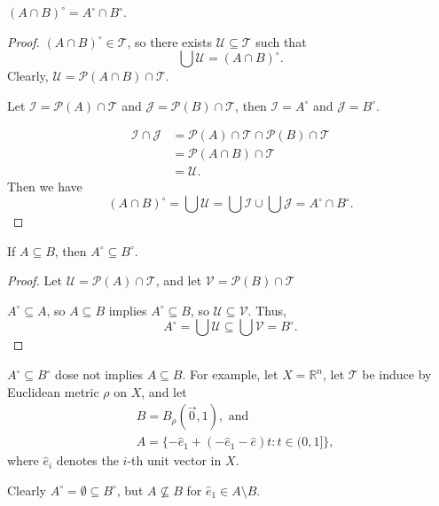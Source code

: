 \begin{proposition}
	$(A \cap B)^\circ = A^\circ \cap B^\circ$.
	
	\begin{proof}
		$(A \cap B)^\circ \in \mathcal T$, so there exists $\mathcal U \subseteq \mathcal T$ such that 
		$$
		\bigcup \mathcal U = (A \cap B)^\circ.
		$$
		Clearly, $\mathcal U = \mathcal P(A \cap B) \cap \mathcal T$.
		
		Let $\mathcal I = \mathcal P(A) \cap \mathcal T$ and $\mathcal J = \mathcal P(B) \cap \mathcal T$, then $\mathcal I = A^\circ$ and $\mathcal J = B^\circ$. 
		
		$$
		\begin{aligned}
			\mathcal I \cap \mathcal J &= \mathcal P(A) \cap \mathcal T \cap \mathcal P(B) \cap \mathcal T \\
			&= \mathcal P(A \cap B) \cap \mathcal T \\
			&= \mathcal U.
		\end{aligned}
		$$
		Then we have
		$$
		(A \cap B)^\circ = \bigcup \mathcal U = \bigcup \mathcal I \cup \bigcup \mathcal J = A^\circ \cap B^\circ.
		$$
	\end{proof}
\end{proposition}


\begin{proposition}
	If $A \subseteq B$, then $A^\circ \subseteq B^\circ$.
	
	\begin{proof}
		Let $\mathcal U = \mathcal P(A) \cap \mathcal T$, and let $\mathcal V = \mathcal P(B) \cap \mathcal T$
	
		$A^\circ \subseteq A$, so $A \subseteq B$ implies $A^\circ \subseteq B$, so $\mathcal U \subseteq \mathcal V$. Thus,
		$$
		A^\circ = \bigcup \mathcal{U} \subseteq \bigcup \mathcal V = B^\circ.
		$$
	\end{proof}
\end{proposition}


\begin{note}
	$A^\circ \subseteq B^\circ$ dose not implies $A \subseteq B$. For example, let $X = \mathbb R^n$, let $\mathcal T$ be induce by Euclidean metric $\rho$ on $X$, and let
	$$
	\begin{aligned}
		& B = B_\rho (\vec 0, 1), \text{ and} \\
		& A = \{ -\hat e_1 + (- \hat e_1 - \hat e)t : t \in (0, 1] \},
	\end{aligned}
	$$
	where $\hat e_i$ denotes the $i$-th unit vector in $X$.
	
	Clearly $A^\circ = \emptyset \subseteq B^\circ$, but $A \not \subseteq B$ for $\hat e_1 \in A \setminus B$.
\end{note}



